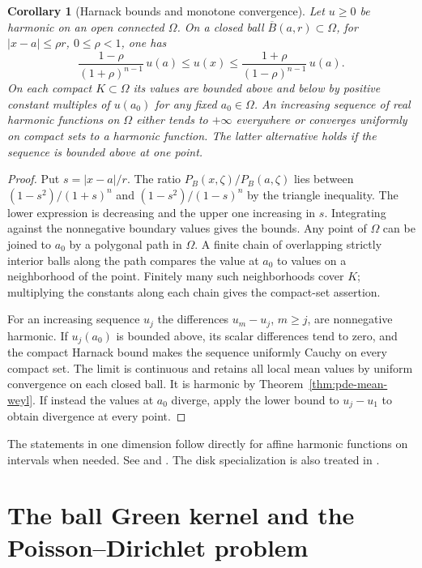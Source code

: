 \documentclass[11pt,oneside,openany]{book}
\theoremstyle{plain}
\newtheorem{corollary}[theorem]{Corollary}
\theoremstyle{definition}
\theoremstyle{remark}
\begin{document}
\begin{corollary}[Harnack bounds and monotone convergence]
\label{cor:pde-harmonic-harnack}
Let \(u\ge0\) be harmonic on an open connected \(\Omega\).
On a closed ball \(\overline B(a,r)\subset\Omega\), for
\(|x-a|\le \rho r\), \(0\le\rho<1\), one has
\[
 \frac{1-\rho}{(1+\rho)^{n-1}}\,u(a)
 \le u(x)\le
 \frac{1+\rho}{(1-\rho)^{n-1}}\,u(a).
\]
On each compact \(K\subset\Omega\) its values are bounded above
and below by positive constant multiples of \(u(a_0)\) for
any fixed \(a_0\in\Omega\). An increasing sequence of real
harmonic functions on \(\Omega\) either tends to \(+\infty\)
everywhere or converges uniformly on compact sets to a harmonic
function. The latter alternative holds if the sequence is
bounded above at one point.
\end{corollary}
\begin{proof}
Put \(s=|x-a|/r\). The ratio
\(P_B(x,\zeta)/P_B(a,\zeta)\) lies between
\((1-s^2)/(1+s)^n\) and \((1-s^2)/(1-s)^n\) by the
triangle inequality. The lower expression is decreasing
and the upper one increasing in \(s\). Integrating against
the nonnegative boundary values gives the bounds.
Any point of \(\Omega\) can be joined to \(a_0\) by
a polygonal path in \(\Omega\). A finite chain of
overlapping strictly interior balls along the path compares
the value at \(a_0\) to values on a neighborhood of the
point. Finitely many such neighborhoods cover \(K\);
multiplying the constants along each chain gives the
compact-set assertion.

For an increasing sequence \(u_j\) the differences
\(u_m-u_j\), \(m\ge j\), are nonnegative harmonic.
If \(u_j(a_0)\) is bounded above, its scalar differences tend
to zero, and the compact Harnack bound makes the sequence
uniformly Cauchy on every compact set. The limit is continuous
and retains all local mean values by uniform convergence on
each closed ball. It is harmonic by
Theorem~\ref{thm:pde-mean-weyl}. If instead the values
at \(a_0\) diverge, apply the lower bound to \(u_j-u_1\)
to obtain divergence at every point.
\end{proof}

The statements in one dimension follow directly for affine
harmonic functions on intervals when needed.
See \cite[Sections 1.3--1.5]{AG} and
\cite[Sections 2.3 and 2.5]{GT}. The disk specialization
is also treated in \cite[Chapter 13]{D12}.

\section{The ball Green kernel and the Poisson--Dirichlet problem}
\label{pde:L06}
\end{document}
